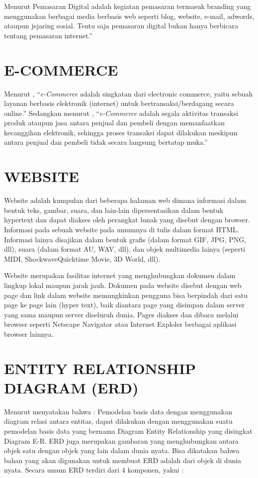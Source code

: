 \par Menurut \cite{tarigan2013creative} Pemasaran Digital adalah kegiatan pemasaran termasuk branding yang menggunakan berbagai media berbasis web seperti blog, website, e-mail, adwords, ataupun jejaring sosial. Tentu saja pemasaran digital bukan hanya berbicara tentang pemasaran internet.”

\section{\uppercase{E-commerce}}
Menurut \cite{yuhefizar2013} , “\textit{e-Commerce} adalah singkatan dari electronic commerce, yaitu sebuah layanan berbasis elektronik (internet) untuk bertransaksi/berdagang secara online.” Sedangkan menurut \cite{saputra2013}, “\textit{e-Commerce} adalah segala aktivitas transaksi produk ataupun jasa antara penjual dan pembeli dengan memanfaatkan kecanggihan elektronik, sehingga proses transaksi dapat dilakukan meskipun antara penjual dan pembeli tidak secara langsung bertatap muka.”

\section{\uppercase{Website}}
Website adalah kumpulan dari beberapa halaman web dimana informasi dalam bentuk teks, gambar, suara, dan lain-lain dipersentasikan dalam bentuk hypertext dan dapat diakses oleh perangkat lunak yang disebut dengan browser. Informasi pada sebuah website pada umumnya di tulis dalam format HTML. Informasi lainya disajikan dalam bentuk grafis (dalam format GIF, JPG, PNG, dll), suara (dalam format AU, WAV, dll), dan objek multimedia lainya (seperti MIDI, ShockwaveQuicktime Movie, 3D World, dll).

\par Website merupakan fasilitas internet yang menghubungkan dokumen dalam lingkup lokal maupun jarak jauh. Dokumen pada website disebut dengan web page dan link dalam website memungkinkan pengguna bisa berpindah dari satu page ke page lain (hyper text), baik diantara page yang disimpan dalam server yang sama maupun server diseluruh dunia. Pages diakses dan dibaca melalui browser seperti Netscape Navigator atau Internet Exploler berbagai aplikasi browser lainnya. \citep{hakim2004}

\section{\uppercase{Entity Relationship Diagram (ERD)}}
Menurut \cite{priyadi2014} menyatakan bahwa : Pemodelan basis data dengan menggunakan diagram relasi antara entitas, dapat dilakukan dengan menggunakan suatu pemodelan basis data yang bernama Diagram Entity Relationship yang disingkat Diagram E-R. ERD juga merupakan gambaran yang menghubungkan antara objek satu dengan objek yang lain dalam dunia nyata. Bisa dikatakan bahwa bahan yang akan digunakan untuk membuat ERD adalah dari objek di dunia nyata. Secara umum ERD terdiri dari 4 komponen, yakni :

